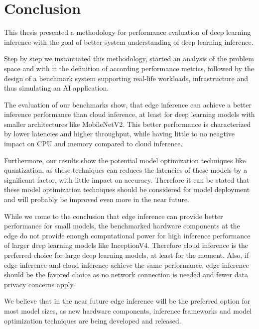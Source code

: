 \chapter{Conclusion}
\label{chap:conclusion}
%
This thesis presented a methodology for performance evaluation of deep learning inference with the goal of better system understanding of deep learning inference.

Step by step we instantiated this methodology, started an analysis of the problem space and with it the definition of according performance metrics, followed by the design of a benchmark system supporting real-life workloads, infrastructure and thus simulating an AI application.

The evaluation of our benchmarks show, that edge inference can achieve a better inference performance than cloud inference, at least for deep learning models with smaller architectures like MobileNetV2.
This better performance is characterized by lower latencies and higher throughput, while having little to no neagtive impact on CPU and memory compared to cloud inference.

Furthermore, our results show the potential model optimization techniques like quantization, as these techniques can reduces the latencies of these models by a significant factor, with little impact on accuracy.
Therefore it can be stated that these model optimization techniques should be considered for model deployment and will probably be improved even more in the near future.

While we come to the conclusion that edge inference can provide better performance for small models, the benchmarked hardware components at the edge do not provide enough computational power for high inference performance of larger deep learning models like InceptionV4.
Therefore cloud inference is the preferred choice for large deep learning models, at least for the moment.
Also, if edge inference and cloud inference achieve the same performance, edge inference should be the favored choice as no network connection is needed and fewer data privacy concerns apply.

We believe that in the near future edge inference will be the preferred option for most model sizes, as new hardware components, inference frameworks and model optimization techniques are being developed and released.


